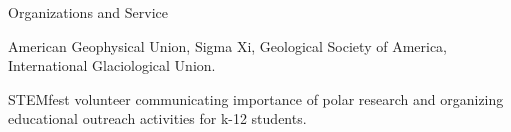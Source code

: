 \begin{cvlist}{Organizations and Service}
        \item American Geophysical Union, Sigma Xi, Geological Society of America, International Glaciological Union.
        \item STEMfest volunteer communicating importance of polar research and organizing educational outreach activities for k-12 students.
\end{cvlist}

